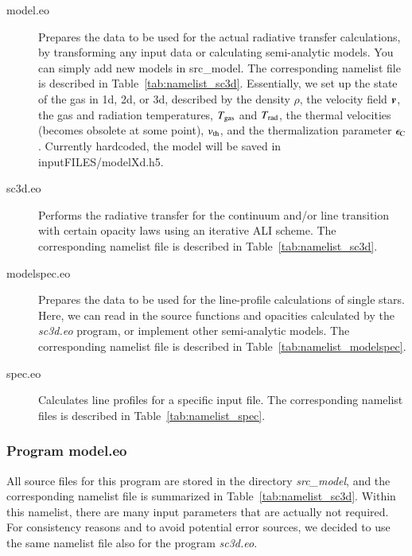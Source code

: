 \documentclass[10pt,a4paper]{article}
\begin{document}
\begin{description}
\item[model.eo] Prepares the data to be used for the actual radiative
  transfer calculations, by transforming any input data or calculating
  semi-analytic models. You can simply add new models in
  src\_model. The corresponding namelist file is described in
  Table~\ref{tab:namelist_sc3d}. Essentially, we set up the state of
  the gas in 1d, 2d, or 3d, described by the density $\rho$, the
  velocity field $\boldsymbol{v}$, the gas and radiation temperatures,
  $T_{\rm gas}$ and $T_{\rm rad}$, the thermal velocities (becomes obsolete at some
  point), $v_{\rm th}$, and the thermalization parameter $\epsilon_{\rm C}$. Currently hardcoded, the model will be saved in
  inputFILES/modelXd.h5.
\item[sc3d.eo] Performs the radiative transfer for the continuum
  and/or line transition with certain opacity laws using an iterative
  ALI scheme. The corresponding namelist file is described in
  Table~\ref{tab:namelist_sc3d}.
\item[modelspec.eo] Prepares the data to be
  used for the line-profile calculations of single stars. Here, we can
  read in the source functions and opacities calculated by the
  \textit{sc3d.eo} program, or implement other semi-analytic
  models. The corresponding namelist file is described in
  Table~\ref{tab:namelist_modelspec}.
\item[spec.eo] Calculates line profiles for a specific input file. The
  corresponding namelist files is described in
  Table~\ref{tab:namelist_spec}.
\end{description}
%
%
%
\subsubsection{Program model.eo}
All source files for this program are stored in the directory
\textit{src\_model}, and the corresponding namelist file is summarized
in Table~\ref{tab:namelist_sc3d}. Within this namelist, there are many
input parameters that are actually not required. For consistency
reasons and to avoid potential error sources, we decided to use the
same namelist file also for the program \textit{sc3d.eo}.
\end{document}
